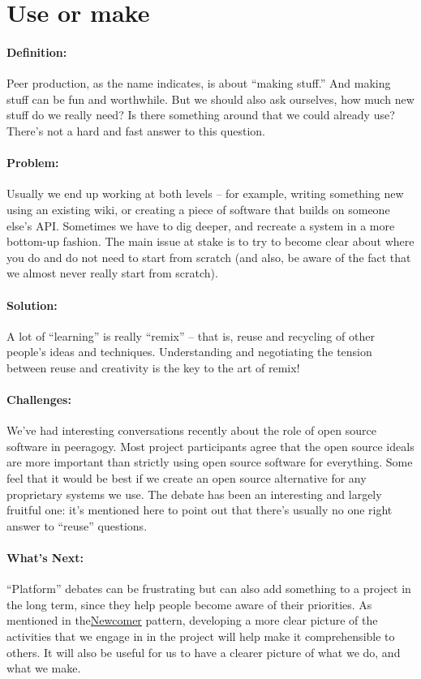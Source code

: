 \section{Use or make}
\paragraph{Definition:} Peer production, as the name indicates, is about
``making stuff.'' And making stuff can be fun and worthwhile. But we
should also ask ourselves, how much new stuff do we really need? Is
there something around that we could already use? There's not a hard and
fast answer to this question.

\paragraph{Problem:} Usually we end up working at both levels -- for
example, writing something new using an existing wiki, or creating a
piece of software that builds on someone else's API. Sometimes we have
to dig deeper, and recreate a system in a more bottom-up fashion. The
main issue at stake is to try to become clear about where you do and do
not need to start from scratch (and also, be aware of the fact that we
almost never really start from scratch).

\paragraph{Solution:} A lot of ``learning'' is really ``remix'' -- that is,
reuse and recycling of other people's ideas and techniques.
Understanding and negotiating the tension between reuse and creativity
is the key to the art of remix!

\paragraph{Challenges:} We've had interesting conversations recently about
the role of open source software in peeragogy. Most project participants
agree that the open source ideals are more important than strictly using
open source software for everything. Some feel that it would be best if
we create an open source alternative for any proprietary systems we use.
The debate has been an interesting and largely fruitful one: it's
mentioned here to point out that there's usually no one right answer to
``reuse'' questions.

\paragraph{What's Next:} ``Platform'' debates can be frustrating but can
also add something to a project in the long term, since they help people
become aware of their priorities. As mentioned in
the\href{http://peeragogy.org/patterns/newcomer/}{Newcomer} pattern,
developing a more clear picture of the activities that we engage in in
the project will help make it comprehensible to others. It will also be
useful for us to have a clearer picture of what we do, and what we make.


